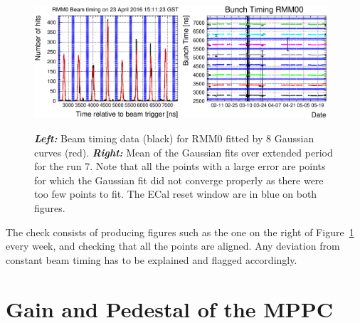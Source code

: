 \begin{figure}[ht]
  \begin{adjustbox}{center}
    \includegraphics[width=0.48\textwidth]{images/DataQuality/BeamTimingDetail.eps}
    \includegraphics[width=0.48\textwidth]{images/DataQuality/BeamTimingRun7.eps} 
  \end{adjustbox}
  \caption[Run 7 beam timing data of the ECal]{\textbf{\textit{Left:}}
    Beam timing data (black) for \Gls{RMM}0 fitted by 8 Gaussian
    curves (red). \textbf{\textit{Right:}} Mean of the Gaussian fits
    over extended period for the run 7. Note that all the points with
    a large error are points for which the Gaussian fit did not
    converge properly as there were too few points to fit. The
    \Gls{ECal} reset window are in blue on both figures.}
  \label{fig:beamtiming}
\end{figure}

The check consists of producing figures such as the one on the right
of Figure~\ref{fig:beamtiming} every week, and checking that all the
points are aligned. Any deviation from constant beam timing has to be
explained and flagged accordingly.

\section{Gain and Pedestal of the MPPC}
\label{sec:gainped}

